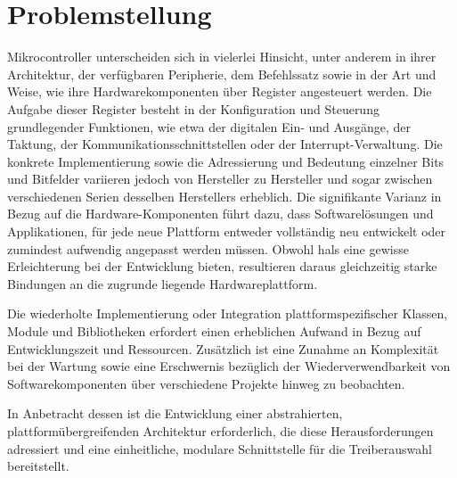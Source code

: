 \section{Problemstellung}
Mikrocontroller unterscheiden sich in vielerlei Hinsicht, unter anderem in ihrer Architektur, der verfügbaren Peripherie, dem Befehlssatz sowie in der Art und Weise, wie ihre Hardwarekomponenten über Register angesteuert werden.
Die Aufgabe dieser Register besteht in der Konfiguration und Steuerung grundlegender Funktionen, wie etwa der digitalen Ein- und Ausgänge, der Taktung, der Kommunikationsschnittstellen oder der Interrupt-Verwaltung.
Die konkrete Implementierung sowie die Adressierung und Bedeutung einzelner Bits und Bitfelder variieren jedoch von Hersteller zu Hersteller und sogar zwischen verschiedenen Serien desselben Herstellers erheblich.
Die signifikante Varianz in Bezug auf die Hardware-Komponenten führt dazu, dass Softwarelösungen und Applikationen, für jede neue Plattform entweder vollständig neu entwickelt oder zumindest aufwendig angepasst werden müssen.
Obwohl \gls{hals} eine gewisse Erleichterung bei der Entwicklung bieten, resultieren daraus gleichzeitig starke Bindungen an die zugrunde liegende Hardwareplattform.

Die wiederholte Implementierung oder Integration plattformspezifischer Klassen, Module und Bibliotheken erfordert einen erheblichen Aufwand in Bezug auf Entwicklungszeit und Ressourcen.
Zusätzlich ist eine Zunahme an Komplexität bei der Wartung sowie eine Erschwernis bezüglich der Wiederverwendbarkeit von Softwarekomponenten über verschiedene Projekte hinweg zu beobachten.

 In Anbetracht dessen ist die Entwicklung einer abstrahierten, plattformübergreifenden Architektur erforderlich, die diese Herausforderungen adressiert und eine einheitliche, modulare Schnittstelle für die Treiberauswahl bereitstellt.



